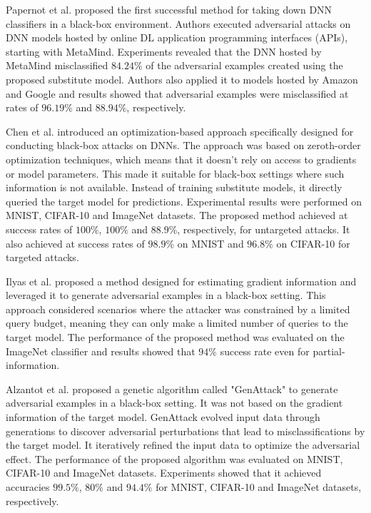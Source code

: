 \documentclass[sn-mathphys]{sn-jnl}%
\theoremstyle{thmstyleone}%
\theoremstyle{thmstyletwo}%
\theoremstyle{thmstylethree}%
\begin{document}
Papernot et al. \cite{papernot2017practical} proposed the first successful method for taking down DNN classifiers in a black-box environment. Authors executed adversarial attacks on DNN models hosted by online DL application programming interfaces (APIs), starting with MetaMind. Experiments revealed that the DNN hosted by MetaMind misclassified $84.24\%$ of the adversarial examples created using the proposed substitute model. Authors also applied it to models hosted by Amazon and Google and results showed that adversarial examples were misclassified at rates of $96.19\%$ and $88.94\%$, respectively. 

Chen et al. \cite{chen2017zoo} introduced an optimization-based approach specifically designed for conducting black-box attacks on DNNs. The approach was based on zeroth-order optimization techniques, which means that it doesn't rely on access to gradients or model parameters. This made it suitable for black-box settings where such information is not available. Instead of training substitute models, it directly queried the target model for predictions. Experimental results were performed on MNIST, CIFAR-10 and ImageNet datasets. The proposed method achieved at success rates of $100\%$, $100\%$ and $88.9\%$, respectively, for untargeted attacks. It also achieved at success rates of $98.9\%$ on MNIST and $96.8\%$ on CIFAR-10 for targeted attacks.  

Ilyas et al. \cite{ilyas2018black} proposed a method designed for estimating gradient information and leveraged it to generate adversarial examples in a black-box setting. This approach considered scenarios where the attacker was constrained by a limited query budget, meaning they can only make a limited number of queries to the target model. %
The performance of the proposed method was evaluated on the ImageNet classifier and results showed that $94\%$ success rate even for partial-information.

 Alzantot et al. \cite{alzantot2019genattack} proposed a genetic algorithm called "GenAttack" to generate adversarial examples in a black-box setting. It was not based on the gradient information of the target model. GenAttack evolved input data through generations to discover adversarial perturbations that lead to misclassifications by the target model. It iteratively refined the input data to optimize the adversarial effect. The performance of the proposed algorithm was evaluated on MNIST, CIFAR-10 and ImageNet datasets. Experiments showed that it achieved accuracies $99.5\%$, $80\%$ and $94.4\%$ for MNIST, CIFAR-10 and ImageNet datasets, respectively.   
\end{document}
